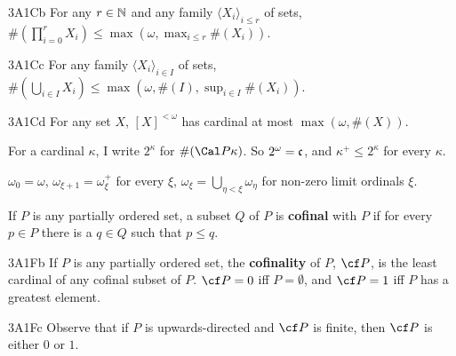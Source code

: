 \spheader 3A1Cb For any $r\in\Bbb N$ and any family
$\langle X_i\rangle_{i\le r}$ of sets,
$\#(\prod_{i=0}^rX_i)\le\max(\omega,\max_{i\le r}\#(X_i))$.

\spheader 3A1Cc For any family $\langle X_i\rangle_{i\in I}$ of sets,
$\#(\bigcup_{i\in I}X_i)\le\max(\omega,\#(I),\sup_{i\in I}\#(X_i))$.

\spheader 3A1Cd For any set $X$, $[X]^{<\omega}$ has
cardinal at most $\max(\omega,\#(X))$.  

 For a cardinal $\kappa$, I write
$2^{\kappa}$ for $\#(\Cal P\kappa)$.   So
$2^{\omega}=\frak c$, and $\kappa^+\le 2^{\kappa}$ for every $\kappa$.

 $\omega_0=\omega$, $\omega_{\xi+1}=\omega_{\xi}^+$ for every
$\xi$,
$\omega_{\xi}=\bigcup_{\eta<\xi}\omega_{\eta}$
for non-zero limit ordinals $\xi$.  

 If $P$ is any partially ordered
set, a
subset $Q$ of $P$ is {\bf cofinal} with $P$ if
for every $p\in P$ there is a $q\in Q$ such that $p\le q$.

\spheader 3A1Fb If $P$ is any partially ordered set, the {\bf
cofinality} of $P$, $\cf P$, is the least cardinal of any cofinal
subset of $P$.    $\cf P=0$ iff $P=\emptyset$,
and $\cf P=1$ iff $P$ has
a greatest element.

\spheader 3A1Fc Observe that if $P$ is upwards-directed and $\cf P$ is
finite, then $\cf P$ is either $0$ or $1$.

